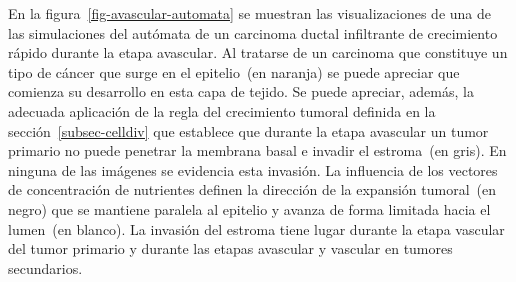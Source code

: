     En la figura~\ref{fig-avascular-automata} se muestran las visualizaciones de una de las simulaciones del aut\'omata de un carcinoma ductal infiltrante de crecimiento r\'apido durante la etapa avascular. Al tratarse de un carcinoma que constituye un tipo de c\'ancer que surge en el epitelio~(en naranja) se puede apreciar que comienza su desarrollo en esta capa de tejido. Se puede apreciar, adem\'as, la adecuada aplicaci\'on de la regla del crecimiento tumoral definida en la secci\'on~\ref{subsec-celldiv} que establece que durante la etapa avascular un tumor primario no puede penetrar la membrana basal e invadir el estroma~(en gris). En ninguna de las im\'agenes se evidencia esta invasi\'on. La influencia de los vectores de concentraci\'on de nutrientes definen la direcci\'on de la expansi\'on tumoral~(en negro) que se mantiene paralela al epitelio y avanza de forma limitada hacia el lumen~(en blanco). La invasi\'on del estroma tiene lugar durante la etapa vascular del tumor primario y durante las etapas avascular y vascular en tumores secundarios. 
